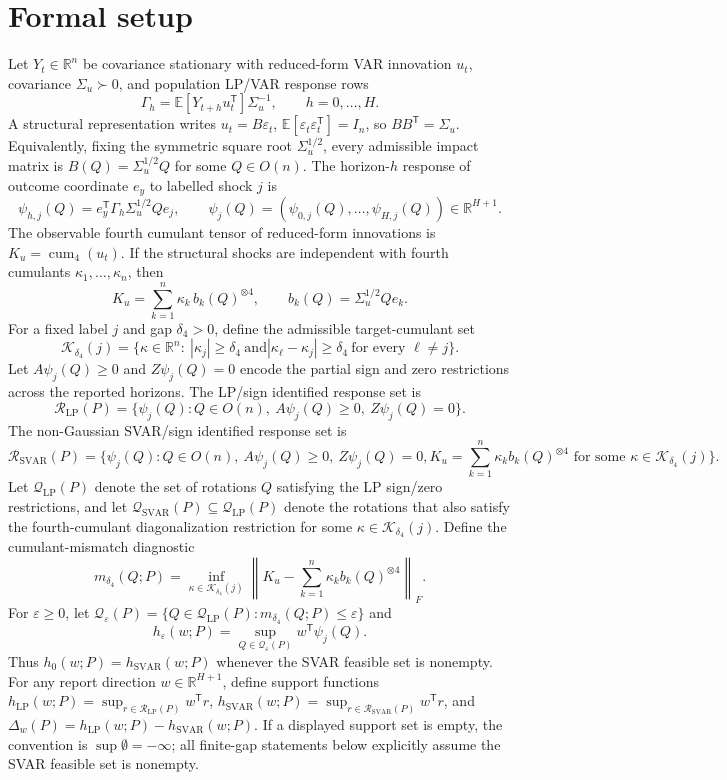 \documentclass[11pt]{article}
\newcommand{\E}{\mathbb{E}}
\newcommand{\transpose}{\mathsf{T}}
\newcommand{\R}{\mathbb{R}}
\theoremstyle{definition}
\theoremstyle{plain}
\theoremstyle{remark}
\begin{document}
\section{Formal setup}
Let \(Y_t\in\R^n\) be covariance stationary with reduced-form VAR innovation \(u_t\), covariance \(\Sigma_u\succ0\), and population LP/VAR response rows
\[
\Gamma_h=\E[Y_{t+h}u_t^\transpose]\Sigma_u^{-1},\qquad h=0,\ldots,H.
\]
A structural representation writes \(u_t=B\varepsilon_t\), \(\E[\varepsilon_t\varepsilon_t^\transpose]=I_n\), so \(BB^\transpose=\Sigma_u\).  Equivalently, fixing the symmetric square root \(\Sigma_u^{1/2}\), every admissible impact matrix is \(B(Q)=\Sigma_u^{1/2}Q\) for some \(Q\in O(n)\).  The horizon-\(h\) response of outcome coordinate \(e_y\) to labelled shock \(j\) is
\[
\psi_{h,j}(Q)=e_y^\transpose\Gamma_h\Sigma_u^{1/2}Qe_j,\qquad
\psi_j(Q)=(\psi_{0,j}(Q),\ldots,\psi_{H,j}(Q))\in\R^{H+1}.
\]
The observable fourth cumulant tensor of reduced-form innovations is \(K_u=\operatorname{cum}_4(u_t)\).  If the structural shocks are independent with fourth cumulants \(\kappa_1,\ldots,\kappa_n\), then
\[
K_u=\sum_{k=1}^n \kappa_k\, b_k(Q)^{\otimes4},
\qquad b_k(Q)=\Sigma_u^{1/2}Qe_k.
\]
For a fixed label \(j\) and gap \(\delta_4>0\), define the admissible target-cumulant set
\[
\mathcal K_{\delta_4}(j)=
\{\kappa\in\R^n:\ |\kappa_j|\ge\delta_4\ \text{and}
|\kappa_\ell-\kappa_j|\ge\delta_4\ \text{for every }\ell\ne j\}.
\]
Let \(A\psi_j(Q)\ge0\) and \(Z\psi_j(Q)=0\) encode the partial sign and zero restrictions across the reported horizons.  The LP/sign identified response set is
\[
\mathcal R_{\mathrm{LP}}(P)=
\{\psi_j(Q):Q\in O(n),\ A\psi_j(Q)\ge0,\ Z\psi_j(Q)=0\}.
\]
The non-Gaussian SVAR/sign identified response set is
\[
\mathcal R_{\mathrm{SVAR}}(P)=
\{\psi_j(Q):Q\in O(n),\ A\psi_j(Q)\ge0,\ Z\psi_j(Q)=0,
K_u=\sum_{k=1}^n \kappa_k b_k(Q)^{\otimes4}\text{ for some }\kappa\in\mathcal K_{\delta_4}(j)\}.
\]
Let \(\mathcal Q_{\mathrm{LP}}(P)\) denote the set of rotations \(Q\) satisfying the LP sign/zero restrictions, and let \(\mathcal Q_{\mathrm{SVAR}}(P)\subseteq\mathcal Q_{\mathrm{LP}}(P)\) denote the rotations that also satisfy the fourth-cumulant diagonalization restriction for some \(\kappa\in\mathcal K_{\delta_4}(j)\).  Define the cumulant-mismatch diagnostic
\[
m_{\delta_4}(Q;P)=
\inf_{\kappa\in\mathcal K_{\delta_4}(j)}
\left\|K_u-\sum_{k=1}^n\kappa_k b_k(Q)^{\otimes4}\right\|_F.
\]
For \(\varepsilon\ge0\), let \(\mathcal Q_\varepsilon(P)=\{Q\in\mathcal Q_{\mathrm{LP}}(P):m_{\delta_4}(Q;P)\le\varepsilon\}\) and
\[
h_\varepsilon(w;P)=\sup_{Q\in\mathcal Q_\varepsilon(P)}w^\transpose\psi_j(Q).
\]
Thus \(h_0(w;P)=h_{\mathrm{SVAR}}(w;P)\) whenever the SVAR feasible set is nonempty.  For any report direction \(w\in\R^{H+1}\), define support functions \(h_{\mathrm{LP}}(w;P)=\sup_{r\in\mathcal R_{\mathrm{LP}}(P)}w^\transpose r\), \(h_{\mathrm{SVAR}}(w;P)=\sup_{r\in\mathcal R_{\mathrm{SVAR}}(P)}w^\transpose r\), and \(\Delta_w(P)=h_{\mathrm{LP}}(w;P)-h_{\mathrm{SVAR}}(w;P)\).  If a displayed support set is empty, the convention is \(\sup\emptyset=-\infty\); all finite-gap statements below explicitly assume the SVAR feasible set is nonempty.
\end{document}
